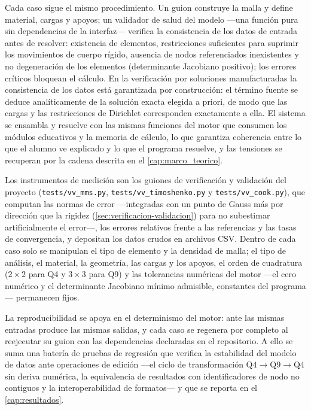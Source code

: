 Cada caso sigue el mismo procedimiento. Un guion construye la malla y define material, cargas y apoyos; un validador de salud del modelo —una función pura sin dependencias de la interfaz— verifica la consistencia de los datos de entrada antes de resolver: existencia de elementos, restricciones suficientes para suprimir los movimientos de cuerpo rígido, ausencia de nodos referenciados inexistentes y no degeneración de los elementos (determinante Jacobiano positivo); los errores críticos bloquean el cálculo. En la verificación por soluciones manufacturadas la consistencia de los datos está garantizada por construcción: el término fuente se deduce analíticamente de la solución exacta elegida a priori, de modo que las cargas y las restricciones de Dirichlet corresponden exactamente a ella. El sistema se ensambla y resuelve con las mismas funciones del motor que consumen los módulos educativos y la memoria de cálculo, lo que garantiza coherencia entre lo que el alumno ve explicado y lo que el programa resuelve, y las tensiones se recuperan por la cadena descrita en el \autoref{cap:marco_teorico}.

Los instrumentos de medición son los guiones de verificación y validación del proyecto (\texttt{tests/vv\_mms.py}, \texttt{tests/vv\_timoshenko.py} y \texttt{tests/vv\_cook.py}), que computan las normas de error —integradas con un punto de Gauss más por dirección que la rigidez (\autoref{sec:verificacion-validacion}) para no subestimar artificialmente el error—, los errores relativos frente a las referencias y las tasas de convergencia, y depositan los datos crudos en archivos CSV. Dentro de cada caso solo se manipulan el tipo de elemento y la densidad de malla; el tipo de análisis, el material, la geometría, las cargas y los apoyos, el orden de cuadratura ($2\times2$ para Q4 y $3\times3$ para Q9) y las tolerancias numéricas del motor —el cero numérico y el determinante Jacobiano mínimo admisible, constantes del programa— permanecen fijos.

La reproducibilidad se apoya en el determinismo del motor: ante las mismas entradas produce las mismas salidas, y cada caso se regenera por completo al reejecutar su guion con las dependencias declaradas en el repositorio. A ello se suma una batería de pruebas de regresión que verifica la estabilidad del modelo de datos ante operaciones de edición —el ciclo de transformación $\text{Q4}\rightarrow\text{Q9}\rightarrow\text{Q4}$ sin deriva numérica, la equivalencia de resultados con identificadores de nodo no contiguos y la interoperabilidad de formatos— y que se reporta en el \autoref{cap:resultados}.

